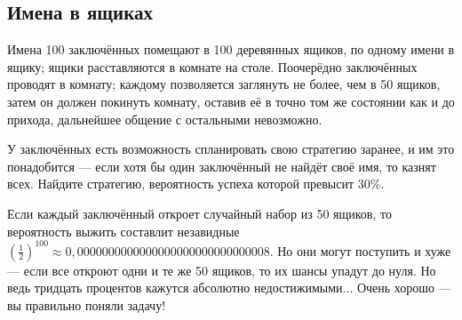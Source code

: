 \subsection*{Имена в ящиках}

Имена 100 заключённых помещают в 100 деревянных ящиков, по одному имени в ящику;
ящики расставляются в комнате на столе.
Поочерёдно заключённых проводят в комнату;
каждому позволяется заглянуть не более, чем в 50 ящиков,
затем он должен покинуть комнату, оставив её в точно том же состоянии как и до прихода,
дальнейшее общение с остальными невозможно.

У заключённых есть возможность спланировать свою стратегию заранее, и им это понадобится --- если хотя бы один заключённый не найдёт своё имя, то казнят всех.
Найдите стратегию, вероятность успеха которой превысит 30\%.

 Если каждый заключённый откроет случайный набор из 50 ящиков, то вероятность выжить составлит незавидные $(\tfrac12)^{100}\approx 0{,}0000000000000000000000000000008$.
Но они могут поступить и хуже --- если все откроют одни и те же 50 ящиков, то их шансы упадут до нуля.
Но ведь тридцать процентов кажутся абсолютно недостижимыми...
Очень хорошо --- вы правильно поняли задачу!
